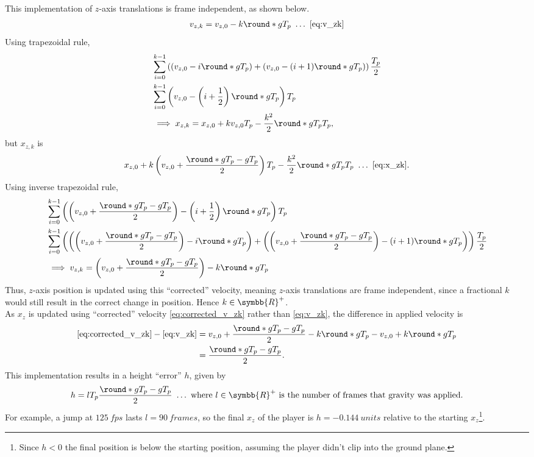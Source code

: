 This implementation of $z$-axis translations is frame independent, as shown below.
\begin{align*}
v_{z,k} = v_{z,0} - k\round*{gT_p}\ \ldots\ \eqref{eq:v_zk}
\end{align*}
Using trapezoidal rule,
\begin{align*}
&\sum_{i=0}^{k-1} \left(\left(v_{z,0} - i\round*{gT_p} \right) + \left(v_{z,0} - (i + 1) \round*{gT_p} \right)\right) \frac{T_p}{2}\\
&\sum_{i=0}^{k-1} \left(v_{z,0} - \left(i + \frac{1}{2} \right) \round*{gT_p} \right) T_p\\
&\implies x_{z,k} = x_{z,0} + k v_{z,0} T_p - \frac{k^2}{2}\round*{gT_p} T_p,
\end{align*}
but $x_{z,k}$ is
\begin{align*}
x_{z,0} + k\left(v_{z,0} + \frac{\round*{gT_p} - gT_p}{2} \right) T_p - \frac{k^2}{2}\round*{gT_p} T_p\ \ldots\ \eqref{eq:x_zk}.
\end{align*}
Using inverse trapezoidal rule,
\begin{align}
\nonumber
&\sum_{i=0}^{k-1} \left(\left(v_{z,0} + \frac{\round*{gT_p} - gT_p}{2} \right) - \left(i + \frac{1}{2} \right) \round*{gT_p} \right) T_p\\\nonumber
&\sum_{i=0}^{k-1} \left(\left(\left(v_{z,0} + \frac{\round*{gT_p} - gT_p}{2} \right) - i\round*{gT_p} \right) + \left(\left(v_{z,0} + \frac{\round*{gT_p} - gT_p}{2} \right) - (i + 1)\round*{gT_p} \right) \right) \frac{T_p}{2}\\
\label{eq:corrected_v_zk}
&\implies v_{z,k} = \left(v_{z,0} + \frac{\round*{gT_p} - gT_p}{2} \right) - k\round*{gT_p}
\end{align}
Thus, $z$-axis position is updated using this ``corrected'' velocity, meaning $z$-axis translations are frame independent, since a fractional $k$ would still result in the correct change in position. Hence $k \in \symbb{R}^+$.\\

As $x_z$ is updated using ``corrected'' velocity \eqref{eq:corrected_v_zk} rather than \eqref{eq:v_zk}, the difference in applied velocity is
\begin{align*}
\eqref{eq:corrected_v_zk} - \eqref{eq:v_zk} &= v_{z,0} + \frac{\round*{gT_p} - gT_p}{2} - k\round*{gT_p} - v_{z,0} + k\round*{gT_p}\\
&= \frac{\round*{gT_p} - gT_p}{2}.
\end{align*}
This implementation results in a height ``error'' $h$, given by
\begin{align}
\label{eq:height_error}
h = l T_p\frac{\round*{gT_p} - gT_p}{2}\ \ldots\ \text{where $l \in \symbb{R}^+$ is the number of frames that gravity was applied}.
\end{align}
For example, a jump at $\qty{125}{fps}$ lasts $l = \qty{90}{frames}$, so the final $x_z$ of the player is $h = \qty{-0.144}{units}$ relative to the starting $x_z$\footnote{Since $h < 0$ the final position is below the starting position, assuming the player didn't clip into the ground plane.}.\\

